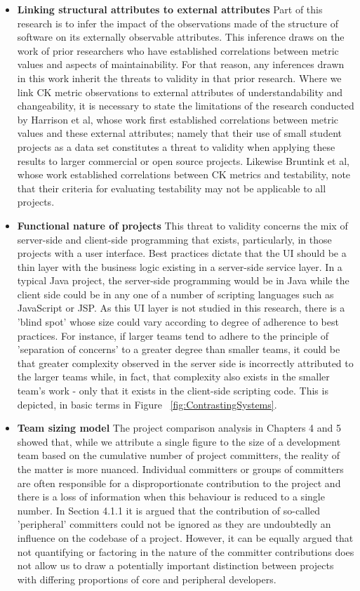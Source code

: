 \begin{itemize}
\item  \textbf{Linking structural attributes to external attributes} Part of this research is to infer the impact of the observations made of the structure of software on its externally observable attributes. This inference draws on the work of prior researchers who have established correlations between metric values and aspects of maintainability. For that reason, any inferences drawn in this work inherit the threats to validity in that prior research. Where we link CK metric observations to external attributes of understandability and changeability, it is necessary to state the limitations of the research conducted by Harrison et al, whose work first established correlations between metric values and these external attributes; namely that their use of small student projects as a data set constitutes a threat to validity when applying these results to larger commercial or open source projects. Likewise Bruntink et al, whose work established correlations between CK metrics and testability, note that their criteria for evaluating testability may not be applicable to all projects.	

\item  \textbf{Functional nature of projects} This threat to validity concerns the mix of server-side and client-side programming that exists, particularly, in those projects with a user interface. Best practices dictate that the UI should be a thin layer with the business logic existing in a server-side service layer. In a typical Java project, the server-side programming would be in Java while the client side could be in any one of a number of scripting languages such as JavaScript or JSP. As this UI layer is not studied in this research, there is a 'blind spot' whose size could vary according to degree of adherence to best practices. For instance, if larger teams tend to adhere to the principle of 'separation of concerns' to a greater degree than smaller teams, it could be that greater complexity observed in the server side is incorrectly attributed to the larger teams while, in fact, that complexity also exists in the smaller team's work - only that it exists in the client-side scripting code. This is depicted, in basic terms in Figure ~\ref{fig:ContrastingSystems}.

\item  \textbf{Team sizing model} The project comparison analysis in Chapters 4 and 5 showed that, while we attribute a single figure to the size of a development team based on the cumulative number of project committers, the reality of the matter is more nuanced. Individual committers or groups of committers are often responsible for a disproportionate contribution to the project and there is a loss of information when this behaviour is reduced to a single number. In Section 4.1.1 it is argued that the contribution of so-called 'peripheral' committers could not be ignored as they are undoubtedly an influence on the codebase of a project. However, it can be equally argued that not quantifying or factoring in the nature of the committer contributions does not allow us to draw a potentially important distinction between projects with differing proportions of core and peripheral developers. 


\end{itemize}
